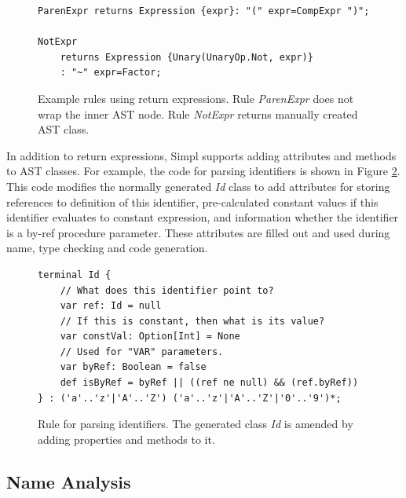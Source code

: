 %
\begin{figure}[!h]
{\small }
\begin{lstlisting}[basicstyle={\footnotesize\ttfamily}]
ParenExpr returns Expression {expr}: "(" expr=CompExpr ")";

NotExpr
    returns Expression {Unary(UnaryOp.Not, expr)}
    : "~" expr=Factor;
\end{lstlisting}
{\small \par}

\caption{\label{fig:Using-return-expressions}Example rules using return expressions.
Rule \emph{ParenExpr} does not wrap the inner AST node. Rule \emph{NotExpr}
returns manually created AST class.}

\end{figure}






In addition to return expressions, Simpl supports adding attributes
and methods to AST classes. For example, the code for parsing identifiers
is shown in Figure \ref{fig:Adding-properties}. This code modifies
the normally generated \emph{Id} class to add attributes for storing
references to definition of this identifier, pre-calculated constant
values if this identifier evaluates to constant expression, and information
whether the identifier is a by-ref procedure parameter. These attributes
are filled out and used during name, type checking and code generation.

%
\begin{figure}[!h]
{\small }
\begin{lstlisting}[basicstyle={\footnotesize\ttfamily}]
terminal Id {
    // What does this identifier point to?
    var ref: Id = null
    // If this is constant, then what is its value?
    var constVal: Option[Int] = None
    // Used for "VAR" parameters.
    var byRef: Boolean = false
    def isByRef = byRef || ((ref ne null) && (ref.byRef))
} : ('a'..'z'|'A'..'Z') ('a'..'z'|'A'..'Z'|'0'..'9')*;
\end{lstlisting}
{\small \par}

\caption{\label{fig:Adding-properties}Rule for parsing identifiers. The generated
class \emph{Id} is amended by adding properties and methods to it.}

\end{figure}



\subsection{Name Analysis}

